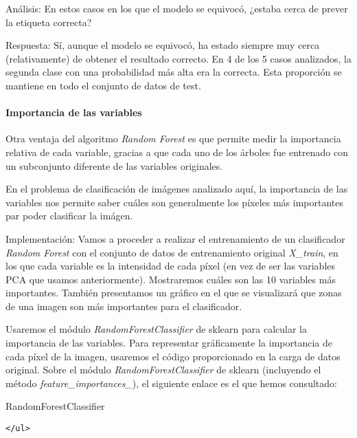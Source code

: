 \documentclass[11pt]{article}
\begin{document}
    Análisis: En estos casos en los que el modelo se equivocó, ¿estaba cerca
de prever la etiqueta correcta?

    Respuesta: Sí, aunque el modelo se equivocó, ha estado siempre muy cerca
(relativamente) de obtener el resultado correcto. En 4 de los 5 casos
analizados, la segunda clase con una probabilidad más alta era la
correcta. Esta proporción se mantiene en todo el conjunto de datos de
test.

    \hypertarget{importancia-de-las-variables}{%
\paragraph{Importancia de las
variables}\label{importancia-de-las-variables}}

    Otra ventaja del algoritmo \emph{Random Forest} es que permite medir la
importancia relativa de cada variable, gracias a que cada uno de los
árboles fue entrenado con un subconjunto diferente de las variables
originales.

En el problema de clasificación de imágenes analizado aquí, la
importancia de las variables nos permite saber cuáles son generalmente
los píxeles más importantes par poder clasificar la imágen.

    Implementación: Vamos a proceder a realizar el entrenamiento de un
clasificador \emph{Random Forest} con el conjunto de datos de
entrenamiento original \emph{X\_train}, en los que cada variable es la
intensidad de cada píxel (en vez de ser las variables PCA que usamos
anteriormente). Mostraremos cuáles son las 10 variables más importantes.
También presentamos un gráfico en el que se visualizará que zonas de una
imagen son más importantes para el clasificador.

Usaremos el módulo \emph{RandomForestClassifier} de sklearn para
calcular la importancia de las variables. Para representar gráficamente
la importancia de cada píxel de la imagen, usaremos el código
proporcionado en la carga de datos original. Sobre el módulo
\emph{RandomForestClassifier} de sklearn (incluyendo el método
\emph{feature\_importances\_}), el siguiente enlace es el que hemos
consultado:

RandomForestClassifier

\begin{verbatim}
</ul>
\end{verbatim}
\end{document}
